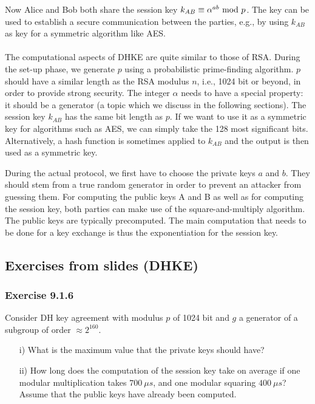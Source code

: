 Now Alice and Bob both share the session key $k_{AB}\equiv\alpha^{ab}\text{ mod } p$. The key can be used to establish a secure communication between the parties, e.g., by using $k_{AB}$ as key for a symmetric algorithm like AES.\\\\
The computational aspects of DHKE are quite similar to those of RSA. During the set-up phase, we generate $p$ using a probabilistic prime-finding algorithm. $p$ should have a similar length as the RSA modulus $n$, i.e., 1024 bit or beyond, in order to provide strong security. The integer $\alpha$ needs to have a special property: it should be a generator (a topic which we discuss in the following sections). The session key $k_{AB}$ has the same bit length as $p$. If we want to use it as a symmetric key for algorithms such as AES, we can simply take the 128 most significant bits. Alternatively, a hash function is sometimes applied to $k_{AB}$ and the output is then used as a symmetric key.

\newpage
\hfill\break
During the actual protocol, we first have to choose the private keys $a$ and $b$. They should stem from a true random generator in order to prevent an attacker from guessing them. For computing the public keys A and B as well as for computing the session key, both parties can make use of the square-and-multiply algorithm. The public keys are typically precomputed. The main computation that needs to be done for a key exchange is thus the exponentiation for the session key.

\subsection{Exercises from slides (DHKE)}
\subsubsection{Exercise 9.1.6}
Consider DH key agreement with modulus $p$ of 1024 bit and $g$ a generator of a subgroup of order $\approx2^{160}$.
\begin{itemize}
    \item[i)] What is the maximum value that the private keys should have?
    \item[ii)] How long does the computation of the session key take on average if one modular multiplication takes $700\ \mu s$, and one modular squaring $400\ \mu s$? Assume that the public keys have already been computed.
\end{itemize}

